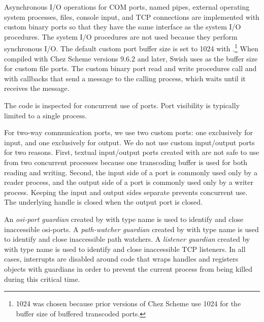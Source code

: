 Asynchronous I/O operations for COM ports, named pipes, external
operating system processes, files, console input, and TCP connections
are implemented with custom binary ports so that they have the same
interface as the system I/O procedures. The system I/O procedures are
not used because they perform synchronous I/O.  The default custom port buffer
size is set to 1024 with .\footnote{1024 was
chosen because prior versions of Chez Scheme use 1024 for the buffer size
of buffered transcoded ports.}
When compiled with Chez Scheme versions 9.6.2 and later, Swish uses
 as the buffer size for custom file ports.
The custom binary port read and write
procedures call  and 
with callbacks that send a message to the calling process, which waits
until it receives the message.

  \mitigation The code is
inspected for concurrent use of ports. Port visibility is typically
limited to a single process.

For two-way communication ports, we use two custom ports: one
exclusively for input, and one exclusively for output. We do not use
custom input/output ports for two reasons.  First, textual
input/output ports created with  are not safe
to use from two concurrent processes because one transcoding buffer is
used for both reading and writing.  Second, the input side of a port
is commonly used only by a reader process, and the output side of a
port is commonly used only by a writer process.  Keeping the input and
output sides separate prevents concurrent use. The underlying handle
is closed when the output port is closed.

  \mitigation An
\emph{osi-port guardian}
created by  with type name 
is used to identify and close inaccessible osi-ports.
A \emph{path-watcher guardian}
created by  with type name 
is used to identify and close inaccessible path
watchers.  A \emph{listener
  guardian}
created by  with type name 
is used to identify and close inaccessible TCP listeners. In all cases, interrupts are disabled around code that
wraps handles and registers objects with guardians in order to prevent
the current process from being killed during this critical time.

